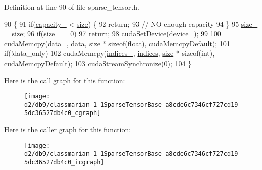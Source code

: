 Definition at line 90 of file sparse\+\_\+tensor.\+h.


\begin{DoxyCode}
90                                                                      \{
91     \textcolor{keywordflow}{if}(\hyperlink{classmarian_1_1SparseTensorBase_a141ed92eb61d17e41085f55c57446dc1}{capacity\_} < \hyperlink{classmarian_1_1SparseTensorBase_af8c34e3fb5b12c7a65dbe6892c5ca0d1}{size}) \{
92       \textcolor{keywordflow}{return};
93       \textcolor{comment}{// NO enough capacity}
94     \}
95     \hyperlink{classmarian_1_1SparseTensorBase_a688fe45dc53bafb2eaded0ea9303867c}{size\_} = \hyperlink{classmarian_1_1SparseTensorBase_af8c34e3fb5b12c7a65dbe6892c5ca0d1}{size};
96     \textcolor{keywordflow}{if}(\hyperlink{classmarian_1_1SparseTensorBase_af8c34e3fb5b12c7a65dbe6892c5ca0d1}{size} == 0)
97       \textcolor{keywordflow}{return};
98     cudaSetDevice(\hyperlink{classmarian_1_1SparseTensorBase_a56fcd8295b57ec3eb731cd431f80c110}{device\_});
99 
100     cudaMemcpy(\hyperlink{classmarian_1_1SparseTensorBase_a633f417eb28496e8c0268e551e1992cf}{data\_}, \hyperlink{classmarian_1_1SparseTensorBase_aff6f84e8e953b957e131c474c4485563}{data}, \hyperlink{classmarian_1_1SparseTensorBase_af8c34e3fb5b12c7a65dbe6892c5ca0d1}{size} * \textcolor{keyword}{sizeof}(\textcolor{keywordtype}{float}), cudaMemcpyDefault);
101     \textcolor{keywordflow}{if}(!data\_only)
102       cudaMemcpy(\hyperlink{classmarian_1_1SparseTensorBase_a365dfd224d685b1cc9c8006d5f608cbf}{indices\_}, \hyperlink{classmarian_1_1SparseTensorBase_a6b3971141be6c3baddc84d70eea1f0c2}{indices}, \hyperlink{classmarian_1_1SparseTensorBase_af8c34e3fb5b12c7a65dbe6892c5ca0d1}{size} * \textcolor{keyword}{sizeof}(\textcolor{keywordtype}{int}), cudaMemcpyDefault);
103     cudaStreamSynchronize(0);
104   \}
\end{DoxyCode}


Here is the call graph for this function\+:
\nopagebreak
\begin{figure}[H]
\begin{center}
\leavevmode
\texttt{[image: d2/db9/classmarian\_1\_1SparseTensorBase\_a8cde6c7346cf727cd195dc36527db4c0\_cgraph]}
\end{center}
\end{figure}




Here is the caller graph for this function\+:
\nopagebreak
\begin{figure}[H]
\begin{center}
\leavevmode
\texttt{[image: d2/db9/classmarian\_1\_1SparseTensorBase\_a8cde6c7346cf727cd195dc36527db4c0\_icgraph]}
\end{center}
\end{figure}


